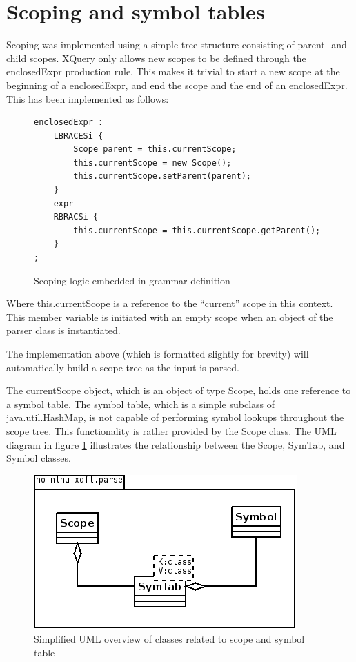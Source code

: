 \section{Scoping and symbol tables}
\label{sect:impl:scoping_and_symtab}
Scoping was implemented using a simple tree structure consisting of parent- and
child scopes. XQuery only allows new scopes to be defined through the
enclosedExpr production rule. This makes it trivial to start a new scope at the
beginning of a enclosedExpr, and end the scope and the end of an enclosedExpr.
This has been implemented as follows:
\begin{figure}[!h]
\begin{verbatim}
enclosedExpr : 
    LBRACESi {
        Scope parent = this.currentScope; 
        this.currentScope = new Scope(); 
        this.currentScope.setParent(parent); 
    }
    expr 
    RBRACSi { 
        this.currentScope = this.currentScope.getParent(); 
    }
;
\end{verbatim}
\caption{Scoping logic embedded in grammar definition}
\end{figure}

Where this.currentScope is a reference to the ``current'' scope in this
context. This member variable is initiated with an empty scope when an object
of the parser class is instantiated.

The implementation above (which is formatted slightly for brevity) will
automatically build a scope tree as the input is parsed.

The currentScope object, which is an object of type Scope, holds one reference
to a symbol table. The symbol table, which is a simple subclass of
java.util.HashMap, is not capable of performing symbol lookups throughout the
scope tree. This functionality is rather provided by the Scope class. The UML diagram
in figure \ref{fig:scope:uml1} illustrates the relationship between the Scope, SymTab, and Symbol
classes.
\begin{figure}[!h]
  \centering
    \includegraphics[scale=0.6]{img/uml1}
  \caption{Simplified UML overview of classes related to scope and symbol table}
  \label{fig:scope:uml1}
\end{figure}

